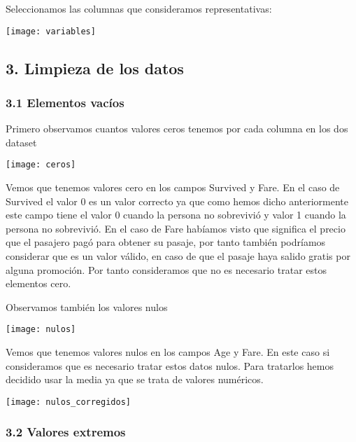 \documentclass[12pt]{article}
\begin{document}
Seleccionamos las columnas que consideramos representativas: 

\label{imagen}
  	\begin{center}
  	\texttt{[image: variables]}
\end{center}

\hypertarget{limpieza}{%
\subsection{3. Limpieza de los datos}\label{limpieza}} 

\hypertarget{ceros}{%
\subsubsection{3.1 Elementos vacíos}\label{ceros}}

Primero observamos cuantos valores ceros tenemos por cada columna en los dos dataset

\label{imagen}
  	\begin{center}
  	\texttt{[image: ceros]}
\end{center}

Vemos que tenemos valores cero en los campos Survived y Fare. En el caso de Survived el valor 0 es un valor correcto ya que como hemos dicho anteriormente este campo tiene el valor 0 cuando la persona no sobrevivió y valor 1 cuando la persona no sobrevivió. En el caso de Fare habíamos visto que significa el precio que el pasajero pagó para obtener su pasaje, por tanto también podríamos considerar que es un valor válido, en caso de que el pasaje haya salido gratis por alguna promoción. Por tanto consideramos que no es necesario tratar estos elementos cero.

Observamos también los valores nulos

\label{imagen}
  	\begin{center}
  	\texttt{[image: nulos]}
\end{center}

Vemos que tenemos valores nulos en los campos Age y Fare. En este caso si consideramos que es necesario tratar estos datos nulos. Para tratarlos hemos decidido usar la media ya que se trata de valores numéricos.

\label{imagen}
  	\begin{center}
  	\texttt{[image: nulos\_corregidos]}
\end{center}


\hypertarget{extremos}{%
\subsubsection{3.2 Valores extremos}\label{extremos}}
\end{document}
